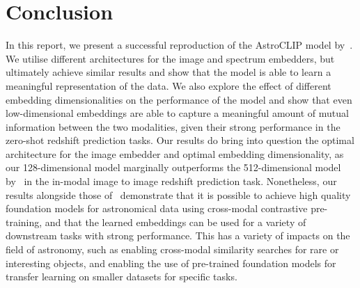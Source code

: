 
\section{Conclusion}\label{sec:conclusion}
In this report, we present a successful reproduction of the AstroCLIP model by~\cite{astroclip}.
We utilise different architectures for the image and spectrum embedders, but ultimately achieve similar results
and show that the model is able to learn a meaningful representation of the data.
We also explore the effect of different embedding dimensionalities on the performance of the model and show that
even low-dimensional embeddings are able to capture a meaningful amount of mutual information between the two modalities,
given their strong performance in the zero-shot redshift prediction tasks.
Our results do bring into question the optimal architecture for the image embedder and optimal
embedding dimensionality, as our 128-dimensional model marginally outperforms the 512-dimensional model by~\cite{astroclip}
in the in-modal image to image redshift prediction task.
Nonetheless, our results alongside those of~\cite{astroclip} demonstrate that it is possible to achieve high quality foundation
models for astronomical data using cross-modal contrastive pre-training, and that the learned embeddings can be used for a variety
of downstream tasks with strong performance.
This has a variety of impacts on the field of astronomy, such as enabling cross-modal similarity searches for rare or interesting
objects, and enabling the use of pre-trained foundation models for transfer learning on smaller datasets for specific tasks.
